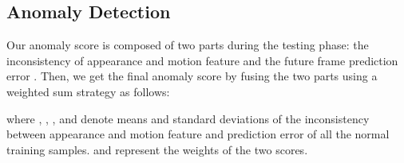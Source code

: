 \documentclass[sigconf]{acmart}
\begin{document}
\subsection{Anomaly Detection}
Our anomaly score is composed of two parts during the testing phase: the inconsistency of appearance and motion feature  and the future frame prediction error . Then, we get the final anomaly score by fusing the two parts using a weighted sum strategy as follows:

where , , , and  denote means and standard deviations of the inconsistency between appearance and motion feature and prediction error of all the normal training samples.  and  represent the weights of the two scores.
\begin{table*}
	\caption{AUROC (\%) comparison between the proposed AMSRC and state-of- the-art video anomaly detection methods on UCSD ped2, CUHK Avenue and ShanghaiTech datasets.}
\end{table*}
\end{document}

